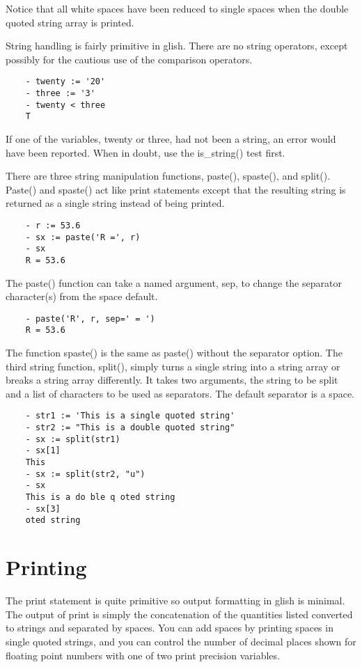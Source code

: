 Notice that all white spaces have been reduced to single spaces when the
double quoted string array is printed.

    String handling is fairly primitive in glish.  There are no string
operators, except possibly for the cautious use of the comparison
operators.

\begin{verbatim}
	- twenty := '20'
	- three := '3'
	- twenty < three
	T
\end{verbatim}

If one of the variables, twenty or three, had not been a string, an
error would have been reported.  When in doubt, use the is\_string() test
first.

    There are three string manipulation functions, paste(), spaste(), and
split().  Paste() and spaste() act like print statements except that the
resulting string is returned as a single string instead of being printed.

\begin{verbatim}
	- r := 53.6
	- sx := paste('R =', r)
	- sx
	R = 53.6
\end{verbatim}

The paste() function can take a named argument, sep, to change the
separator character(s) from the space default.

\begin{verbatim}
	- paste('R', r, sep=' = ')
	R = 53.6
\end{verbatim}

The function spaste() is the same as paste() without the separator option.
The third string function, split(), simply turns a single string into a
string array or breaks a string array differently.  It takes two arguments,
the string to be split and a list of characters to be used as separators.
The default separator is a space.

\begin{verbatim}
	- str1 := 'This is a single quoted string'
	- str2 := "This is a double quoted string"
	- sx := split(str1)
	- sx[1]
	This
	- sx := split(str2, "u")
	- sx
	This is a do ble q oted string
	- sx[3]
	oted string
\end{verbatim}

\section{Printing}

    The print statement is quite primitive so output formatting in glish is
minimal.  The output of print is simply the concatenation of the quantities
listed converted to strings and separated by spaces.  You can add spaces by
printing spaces in single quoted strings, and you can control the number of
decimal places shown for floating point numbers with one of two print
precision variables.

